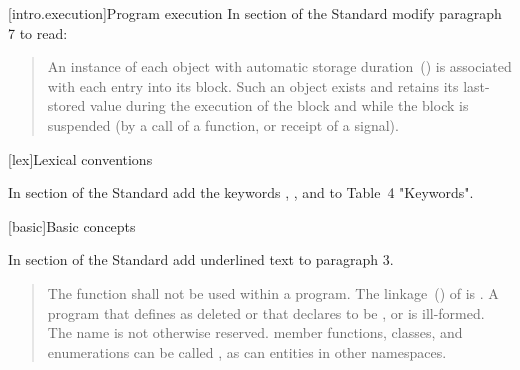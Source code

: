%

[intro.execution]{Program execution}
In section  of the \Cpp Standard modify paragraph 7 to read:
\begin{quote}
\setcounter{Paras}{6}
\pnum 
An instance of each object with automatic storage 
duration~() is associated with each entry into its 
block. Such an object exists and retains its last-stored value during 
the execution of the block and while the block is suspended (by a call 
of a function, 
or receipt of a signal). 
\end{quote}

[lex]{Lexical conventions}

In section  of the \Cpp Standard 
add the keywords , , and
 to Table~4 "Keywords".


[basic]{Basic concepts}



In section  of the \Cpp Standard 
add underlined text to paragraph 3.

\begin{quote}
	\setcounter{Paras}{2}
	
	\pnum
	The function  shall not be used within
	a program.
	The linkage~() of  is
	. A program that defines  as
	deleted or that declares  to be
	 , or  is ill-formed. 
	The name  is
	not otherwise reserved. \enterexample member functions, classes, and
	enumerations can be called , as can entities in other
	namespaces. \exitexample
\end{quote}

